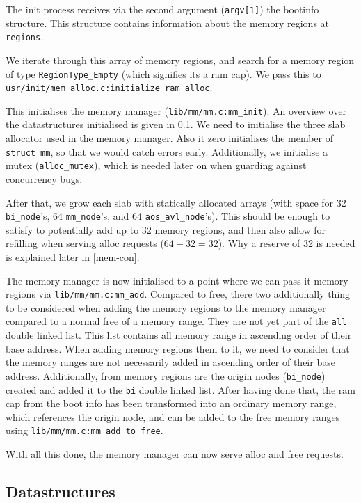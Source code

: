 The init process receives via the second argument (\verb|argv[1]|) the bootinfo
structure.
This structure contains information about the memory regions at \verb|regions|.

We iterate through this array of memory regions, and search for a memory region
of type \verb|RegionType_Empty| (which signifies its a ram cap).
We pass this to \verb|usr/init/mem_alloc.c:initialize_ram_alloc|.

This initialises the memory manager (\verb|lib/mm/mm.c:mm_init|).
An overview over the datastructures initialised is given in \ref{mem-data}.
We need to initialise the three slab allocator used in the memory manager.
Also it zero initialises the member of \verb|struct mm|, so that we would catch
errors early.
Additionally, we initialise a mutex (\verb|alloc_mutex|), which is needed later
on when guarding against concurrency bugs.

After that, we grow each slab with statically allocated arrays (with space for
32 \verb|bi_node|'s, 64 \verb|mm_node|'s, and 64 \verb|aos_avl_node|'s).
This should be enough to satisfy to potentially add up to 32 memory regions,
and then also allow for refilling when serving alloc requests ($64-32=32$).
Why a reserve of 32 is needed is explained later in \ref{mem-con}.

The memory manager is now initialised to a point where we can pass it memory
regions via \verb|lib/mm/mm.c:mm_add|.
Compared to free, there two additionally thing to be considered when adding the
memory regions to the memory manager compared to a normal free of a memory
range.
They are not yet part of the \verb|all| double linked list.
This list contains all memory range in ascending order of their base address.
When adding memory regions them to it, we need to consider that the memory
ranges are not necessarily added in ascending order of their base address.
Additionally, from memory regions are the origin nodes (\verb|bi_node|) created
and added it to the \verb|bi| double linked list.
After having done that, the ram cap from the boot info has been transformed into
an ordinary memory range, which references the origin node, and can be added to
the free memory ranges using \verb|lib/mm/mm.c:mm_add_to_free|.

With all this done, the memory manager can now serve alloc and free requests.

\subsection{Datastructures} \label{mem-data}

